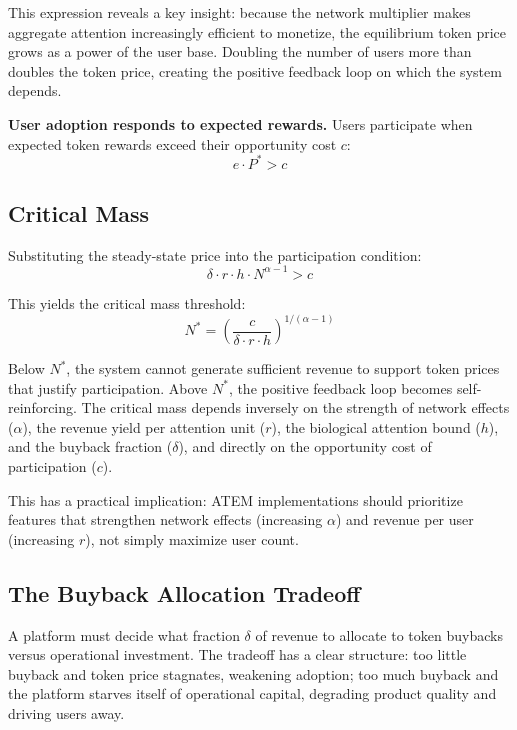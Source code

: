 \documentclass[12pt, a4paper]{article}
\begin{document}
This expression reveals a key insight: because the network multiplier makes aggregate attention increasingly efficient to monetize, the equilibrium token price grows as a power of the user base. Doubling the number of users more than doubles the token price, creating the positive feedback loop on which the system depends.

\textbf{User adoption responds to expected rewards.} Users participate when expected token rewards exceed their opportunity cost $c$:
\begin{equation}
e \cdot P^* > c
\end{equation}

\subsection{Critical Mass}
\label{sec:model-critical}

Substituting the steady-state price into the participation condition:
\begin{equation}
\delta \cdot r \cdot h \cdot N^{\alpha-1} > c
\end{equation}

This yields the critical mass threshold:
\begin{equation}
N^* = \left(\frac{c}{\delta \cdot r \cdot h}\right)^{1/(\alpha-1)}
\label{eq:critical}
\end{equation}

Below $N^*$, the system cannot generate sufficient revenue to support token prices that justify participation. Above $N^*$, the positive feedback loop becomes self-reinforcing. The critical mass depends inversely on the strength of network effects ($\alpha$), the revenue yield per attention unit ($r$), the biological attention bound ($h$), and the buyback fraction ($\delta$), and directly on the opportunity cost of participation ($c$).

This has a practical implication: ATEM implementations should prioritize features that strengthen network effects (increasing $\alpha$) and revenue per user (increasing $r$), not simply maximize user count.

\subsection{The Buyback Allocation Tradeoff}
\label{sec:model-buyback}

A platform must decide what fraction $\delta$ of revenue to allocate to token buybacks versus operational investment. The tradeoff has a clear structure: too little buyback and token price stagnates, weakening adoption; too much buyback and the platform starves itself of operational capital, degrading product quality and driving users away.
\end{document}
